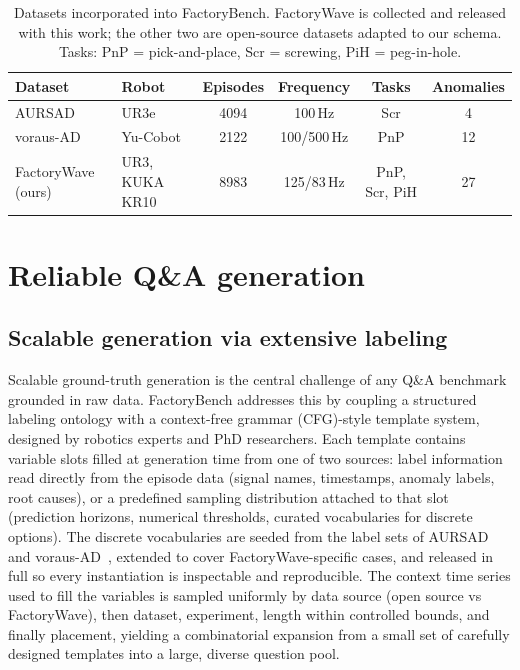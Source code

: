 \documentclass{article}
\begin{document}
\begin{table}[htbp]
    \centering
    \caption{Datasets incorporated into FactoryBench. FactoryWave is collected and released with this work; the other two are open-source datasets adapted to our schema. Tasks: PnP = pick-and-place, Scr = screwing, PiH = peg-in-hole.}
    \label{tab:datasets}
    \small
    \setlength{\tabcolsep}{4pt}
    \begin{tabular}{@{}l l c c c c@{}}
        \toprule
        Dataset                                & Robot          & Episodes & Frequency   & Tasks         & Anomalies \\
        \midrule
        AURSAD~\cite{leporowski2022aursad}     & UR3e           & 4094     & 100\,Hz     & Scr           & 4         \\
        voraus-AD~\cite{brockmann2023vorausad} & Yu-Cobot       & 2122     & 100/500\,Hz & PnP           & 12        \\
        FactoryWave (ours)                     & UR3, KUKA KR10 & 8983     & 125/83\,Hz  & PnP, Scr, PiH & 27        \\
        \bottomrule
    \end{tabular}
\end{table}


\section{Reliable Q\&A generation}

\subsection{Scalable generation via extensive labeling}

Scalable ground-truth generation is the central challenge of any Q\&A benchmark grounded in raw data. FactoryBench addresses this by coupling a structured labeling ontology with a context-free grammar (CFG)-style template system, designed by robotics experts and PhD researchers. Each template contains variable slots filled at generation time from one of two sources: label information read directly from the episode data (signal names, timestamps, anomaly labels, root causes), or a predefined sampling distribution attached to that slot (prediction horizons, numerical thresholds, curated vocabularies for discrete options). The discrete vocabularies are seeded from the label sets of AURSAD~\cite{leporowski2022aursad} and voraus-AD~\cite{brockmann2023vorausad}, extended to cover FactoryWave-specific cases, and released in full so every instantiation is inspectable and reproducible. The context time series used to fill the variables is sampled uniformly by data source (open source vs FactoryWave), then dataset, experiment, length within controlled bounds, and finally placement, yielding a combinatorial expansion from a small set of carefully designed templates into a large, diverse question pool.
\end{document}
